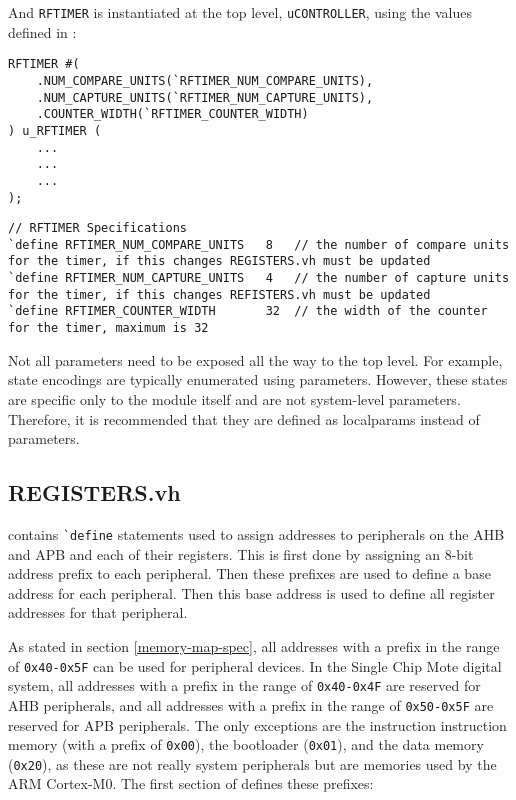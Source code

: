 And \texttt{RFTIMER} is instantiated at the top level, \texttt{uCONTROLLER}, using the values defined in :

\begin{lstlisting}
RFTIMER #(
	.NUM_COMPARE_UNITS(`RFTIMER_NUM_COMPARE_UNITS),
	.NUM_CAPTURE_UNITS(`RFTIMER_NUM_CAPTURE_UNITS),
	.COUNTER_WIDTH(`RFTIMER_COUNTER_WIDTH)
) u_RFTIMER (
	...
	...
	...
);
\end{lstlisting}
\begin{lstlisting}
// RFTIMER Specifications
`define RFTIMER_NUM_COMPARE_UNITS   8   // the number of compare units for the timer, if this changes REGISTERS.vh must be updated
`define RFTIMER_NUM_CAPTURE_UNITS   4   // the number of capture units for the timer, if this changes REFISTERS.vh must be updated
`define RFTIMER_COUNTER_WIDTH       32  // the width of the counter for the timer, maximum is 32
\end{lstlisting}

Not all parameters need to be exposed all the way to the top level. For example, state encodings are typically enumerated using parameters. However, these states are specific only to the module itself and are not system-level parameters. Therefore, it is recommended that they are defined as localparams instead of parameters.
 
\subsection{REGISTERS.vh}
 contains \texttt{\`{}define} statements used to assign addresses to peripherals on the AHB and APB and each of their registers. This is first done by assigning an 8-bit address prefix to each peripheral. Then these prefixes are used to define a base address for each peripheral. Then this base address is used to define all register addresses for that peripheral.

As stated in section \ref{memory-map-spec}, all addresses with a prefix in the range of \texttt{0x40-0x5F} can be used for peripheral devices. In the Single Chip Mote digital system, all addresses with a prefix in the range of 
\texttt{0x40-0x4F} are reserved for AHB peripherals, and all addresses with a prefix in the range of \texttt{0x50-0x5F} are reserved for APB peripherals. The only exceptions are the instruction instruction memory (with a prefix of \texttt{0x00}), the bootloader (\texttt{0x01}), and the data memory (\texttt{0x20}), as these are not really system peripherals but are memories used by the ARM Cortex-M0. The first section of  defines these prefixes:

